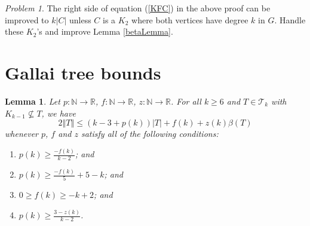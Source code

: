 \documentclass[10pt]{article}
\theoremstyle{plain}
\newtheorem{lem}[thm]{Lemma}
\theoremstyle{definition}
\theoremstyle{remark}
\newtheorem*{problem}{Problem}
\newcommand{\fancy}[1]{\mathcal{#1}}
\newcommand{\IN}{\mathbb{N}}
\newcommand{\IR}{\mathbb{R}}
\newcommand{\T}{\fancy{T}}
\newcommand{\card}[1]{\left|#1\right|}
\newcommand{\size}[1]{\left\Vert#1\right\Vert}
\newcommand{\func}[3]{#1\colon #2 \rightarrow #3}
\begin{document}
\begin{problem}
The right side of equation (\ref{KFC}) in the above proof can be improved to $k\card{C}$ unless $C$ is a $K_2$ where both vertices have degree $k$ in $G$.  
Handle these $K_2$'s and improve Lemma \ref{betaLemma}.
\end{problem}

\section{Gallai tree bounds}
\begin{lem}\label{BoundFamilyWithoutKKMinusOne}
	Let $\func{p}{\IN}{\IR}$, $\func{f}{\IN}{\IR}$, $\func{z}{\IN}{\IR}$.
	For all $k \ge 6$ and $T \in \T_k$ with $K_{k-1} \not \subseteq T$, we have
	\[2\size{T} \le (k-3 + p(k))\card{T} + f(k) + z(k)\beta(T)\]
	whenever $p$, $f$ and $z$ satisfy all of the following conditions:
	\begin{enumerate}
		\item $p(k) \ge \frac{-f(k)}{k-2}$; and
		\item $p(k) \ge \frac{-f(k)}{5} + 5 - k$; and
		\item $0\ge f(k)\ge -k+2$; and
		\item $p(k) \ge \frac{3 - z(k)}{k-2}$.
	\end{enumerate}
\end{lem}
\end{document}
